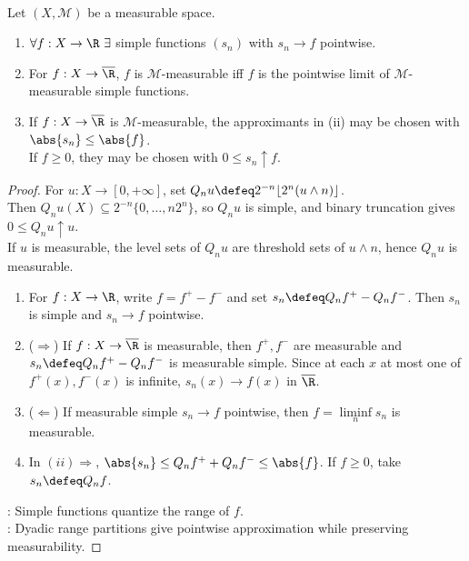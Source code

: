 \begin{theorem} \label{thm:simple-approximation-measurable-functions} \\
Let $(X,\mathcal{M})$ be a measurable space.
\begin{enumerate}[label=(\roman*)]
\setlength{\itemsep}{0pt}
\item $\forall f:X\to\R\ \exists$ simple functions $(s_n)$ with $s_n\to f$ pointwise.
\item For $f:X\to\overline{\R}$, $f$ is $\mathcal{M}$-measurable iff $f$ is the pointwise limit of $\mathcal{M}$-measurable simple functions.
\item If $f:X\to\overline{\R}$ is $\mathcal{M}$-measurable, the approximants in (ii) may be chosen with $\abs{s_n}\leq\abs{f}$.\\
If $f\geq0$, they may be chosen with $0\leq s_n\uparrow f$.
\end{enumerate}
\begin{proof} For $u:X\to[0,+\infty]$, set $Q_nu\defeq2^{-n}\lfloor2^n(u\wedge n)\rfloor$.\\
Then $Q_nu(X)\subseteq2^{-n}\{0,\ldots,n2^n\}$, so $Q_nu$ is simple, and binary truncation gives $0\leq Q_nu\uparrow u$.\\
If $u$ is measurable, the level sets of $Q_nu$ are threshold sets of $u\wedge n$, hence $Q_nu$ is measurable.
\begin{enumerate}[label=(\roman*)]
\setlength{\itemsep}{0pt}
\item For $f:X\to\R$, write $f=f^+-f^-$ and set $s_n\defeq Q_nf^+-Q_nf^-$. Then $s_n$ is simple and $s_n\to f$ pointwise.
\item[$(ii)$] ($\Rightarrow$) If $f:X\to\overline{\R}$ is measurable, then $f^+,f^-$ are measurable and $s_n\defeq Q_nf^+-Q_nf^-$ is measurable simple. Since at each $x$ at most one of $f^+(x),f^-(x)$ is infinite, $s_n(x)\to f(x)$ in $\overline{\R}$.
\item[$(ii)$] ($\Leftarrow$) If measurable simple $s_n\to f$ pointwise, then $f=\liminf\limits_ns_n$ is measurable.
\item[$(iii)$] In $(ii)\Rightarrow$, $\abs{s_n}\leq Q_nf^++Q_nf^-\leq\abs{f}$. If $f\geq0$, take $s_n\defeq Q_nf$.
\end{enumerate}
: Simple functions quantize the range of $f$.\\
: Dyadic range partitions give pointwise approximation while preserving measurability.
\end{proof}
\end{theorem}

